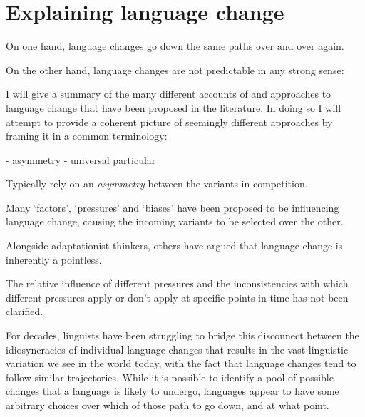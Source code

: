 
\section{Explaining language change}

On one hand, language changes go down the same paths over and over again.

On the other hand, language changes are not predictable in any strong sense:


I will give a summary of the many different accounts of and approaches to language change that have been proposed in the literature. In doing so I will attempt to provide a coherent picture of seemingly different approaches by framing it in a common terminology:

- asymmetry
- universal particular


Typically rely on an \emph{asymmetry} between the variants in competition.

Many `factors', `pressures' and `biases' have been proposed to be influencing language change, causing the incoming variants to be selected over the other.


Alongside adaptationist thinkers, others have argued that language change is inherently a pointless.

The relative influence of different pressures and the inconsistencies with which different pressures apply or don't apply at specific points in time has not been clarified.

For decades, linguists have been struggling to bridge this disconnect between the idiosyncracies of individual language changes that results in the vast linguistic variation we see in the world today, with the fact that language changes tend to follow similar trajectories.
While it is possible to identify a pool of possible changes that a language is likely to undergo, languages appear to have some arbitrary choices over which of those path to go down, and at what point.


